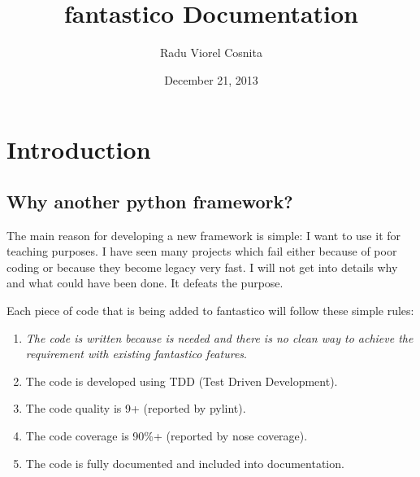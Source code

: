 \documentclass[letterpaper,10pt,english]{sphinxmanual}
\title{fantastico Documentation}
\date{December 21, 2013}
\author{Radu Viorel Cosnita}
\begin{document}
\maketitle
\tableofcontents
{}\label{index::doc}



\chapter{Introduction}
\label{intro:introduction}\label{intro::doc}\label{intro:fantastico-framework}

\section{Why another python framework?}
\label{intro:why-another-python-framework}
The main reason for developing a new framework is simple: I want to use it for teaching purposes. I have seen many projects which
fail either because of poor coding or because they become legacy very fast. I will not get into details why and what could have
been done. It defeats the purpose.

Each piece of code that is being added to fantastico will follow these simple rules:
\begin{enumerate}
\item {} 
\emph{The code is written because is needed and there is no clean way to achieve the requirement with existing fantastico features}.

\item {} 
The code is developed using TDD (Test Driven Development).

\item {} 
The code quality is 9+ (reported by pylint).

\item {} 
The code coverage is 90\%+ (reported by nose coverage).

\item {} 
The code is fully documented and included into documentation.

\end{enumerate}
\end{document}
